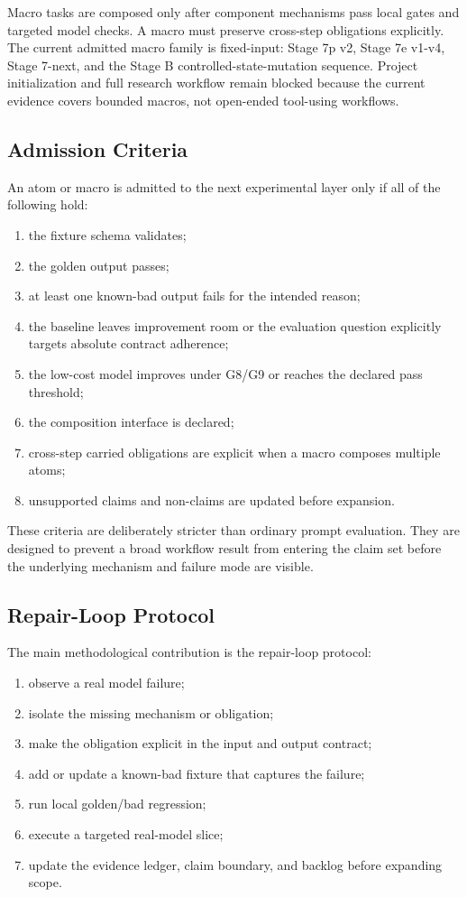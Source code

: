 \documentclass[11pt]{article}
\begin{document}
Macro tasks are composed only after component mechanisms pass local gates and targeted model checks. A macro must preserve cross-step obligations explicitly. The current admitted macro family is fixed-input: Stage 7p v2, Stage 7e v1-v4, Stage 7-next, and the Stage B controlled-state-mutation sequence. Project initialization and full research workflow remain blocked because the current evidence covers bounded macros, not open-ended tool-using workflows.

\subsection{Admission Criteria}

An atom or macro is admitted to the next experimental layer only if all of the following hold:

\begin{enumerate}
\item the fixture schema validates;
\item the golden output passes;
\item at least one known-bad output fails for the intended reason;
\item the baseline leaves improvement room or the evaluation question explicitly targets absolute contract adherence;
\item the low-cost model improves under G8/G9 or reaches the declared pass threshold;
\item the composition interface is declared;
\item cross-step carried obligations are explicit when a macro composes multiple atoms;
\item unsupported claims and non-claims are updated before expansion.
\end{enumerate}

These criteria are deliberately stricter than ordinary prompt evaluation. They are designed to prevent a broad workflow result from entering the claim set before the underlying mechanism and failure mode are visible.

\subsection{Repair-Loop Protocol}

The main methodological contribution is the repair-loop protocol:

\begin{enumerate}
\item observe a real model failure;
\item isolate the missing mechanism or obligation;
\item make the obligation explicit in the input and output contract;
\item add or update a known-bad fixture that captures the failure;
\item run local golden/bad regression;
\item execute a targeted real-model slice;
\item update the evidence ledger, claim boundary, and backlog before expanding scope.
\end{enumerate}
\end{document}
